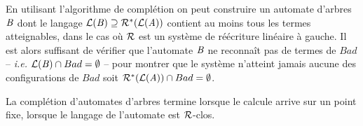 En utilisant l'algorithme de complétion on peut construire un
automate d'arbres $\mathit B$ dont le langage $\mathcal{L}(\mathit B) \supseteq
\mathcal R^*(\mathcal{L}(\mathit A))$ contient au moins tous les termes atteignables, dans le cas
où $\mathcal R$ est un système de réécriture linéaire à gauche.  Il
est alors suffisant de vérifier que l'automate $\mathit B$ ne reconnaît pas
de termes de $Bad$ -- \textit{i.e.} $\mathcal{L}(\mathit B)\cap Bad = \emptyset$ --
pour montrer que le système n'atteint jamais aucune des configurations
de $Bad$ soit $\mathcal R^*(\mathcal{L}(\mathit A))\cap Bad=\emptyset$.







La complétion d'automates d'arbres termine lorsque le calcule arrive sur un point fixe,
lorsque le langage de l'automate est $\mathcal R$-clos.


